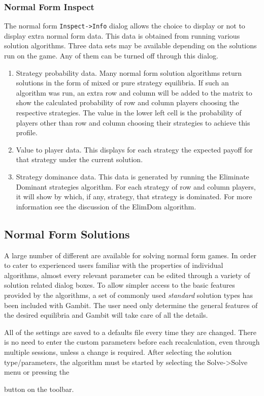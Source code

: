 \subsubsection{Normal Form Inspect}\label{nfinspectsec}
The normal form {\tt Inspect->Info} dialog allows the choice to 
display or not to display extra
normal form data.  This data is obtained from running various solution
algorithms.  Three data sets may be available depending on the solutions
run on the game.  Any of them can be turned off through this dialog.
\begin{enumerate}
\item Strategy probability data.  Many normal form solution
algorithms return solutions in the form of mixed or pure strategy
equilibria.  If such an algorithm was run, an extra row and column will be
added to the matrix to show the calculated probability of row and column
players choosing the respective strategies.  The value in the lower left
cell is the probability of players other than row and column choosing
their strategies to achieve this profile.
\item Value to player data.  This displays for each strategy the expected 
payoff for that strategy under the current solution.  
\item Strategy dominance data.  This data is generated by running
the Eliminate Dominant strategies algorithm.  For each strategy of row and
column players, it will show by which, if any, strategy, that strategy is
dominated.  For more information see the discussion of the ElimDom
algorithm.
\end{enumerate}

\subsection{Normal Form Solutions}\label{NormalFormSolutions}
A large number of different  are 
available for solving normal form
games.  In order to cater to experienced users familiar with the 
properties of individual algorithms, almost every relevant parameter can
be edited through a variety of solution related dialog boxes.  To allow 
simpler access to the basic features provided by the algorithms, a set of
commonly used {\em standard} solution types has been included with Gambit.
The user need only determine the general features of the desired equilibria
and Gambit will take care of all the details.

All of 
the settings are saved to a defaults file every time they are changed. There
is no need to enter the custom parameters before each recalculation, even
through multiple sessions, unless a change is required.
After selecting the solution type/parameters, the algorithm must be started
by selecting the Solve->Solve menu or pressing the 
\begin{figure}
\end{figure}
 button on the toolbar.

